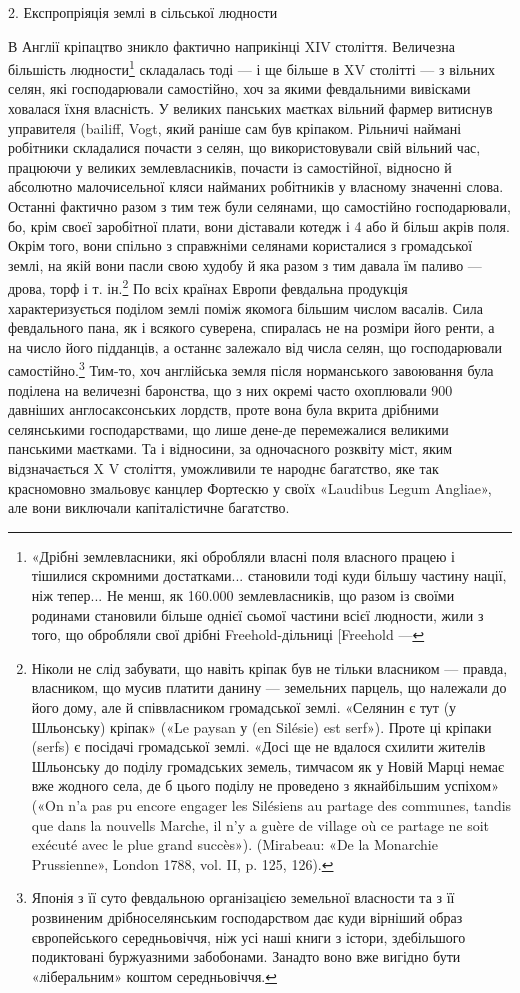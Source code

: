 2. Експропріяція землі в сільської людности

В Англії кріпацтво зникло фактично наприкінці XIV століття.
Величезна більшість людности\footnote{
«Дрібні землевласники, які обробляли власні поля власного працею
і тішилися скромними достатками... становили тоді куди більшу
частину нації, ніж тепер... Не менш, як 160.000 землевласників, що разом
із своїми родинами становили більше однієї сьомої частини всієї людности,
жили з того, що обробляли свої дрібні Freehold-дільниці [Freehold —
} складалась тоді — і ще
більше в XV столітті — з вільних селян, які господарювали
самостійно, хоч за якими февдальними вивісками ховалася їхня
власність. У великих панських маєтках вільний фармер витиснув
управителя (bailiff, Vogt, який раніше сам був кріпаком. Рільничі
наймані робітники складалися почасти з селян, що використовували
свій вільний час, працюючи у великих землевласників,
почасти із самостійної, відносно й абсолютно малочисельної
кляси найманих робітників у власному значенні слова. Останні
фактично разом з тим теж були селянами, що самостійно господарювали,
бо, крім своєї заробітної плати, вони діставали котедж
і 4 або й більш акрів поля. Окрім того, вони спільно з справжніми
селянами користалися з громадської землі, на якій вони пасли
свою худобу й яка разом з тим давала їм паливо — дрова, торф
і т. ін.\footnote{
Ніколи не слід забувати, що навіть кріпак був не тільки власником
— правда, власником, що мусив платити данину — земельних
парцель, що належали до його дому, але й співвласником громадської
землі. «Селянин є тут (у Шльонську) кріпак» («Le paysan у (en Silésie)
est serf»). Проте ці кріпаки (serfs) є посідачі громадської землі. «Досі
ще не вдалося схилити жителів Шльонську до поділу громадських
земель, тимчасом як у Новій Марці немає вже жодного села, де б цього
поділу не проведено з якнайбільшим успіхом» («On n’a pas pu encore
engager les Silésiens au partage des communes, tandis que dans la nouvells
Marche, il n’y a guère de village où ce partage ne soit exécuté avec le plue
grand succès»). (Mirabeau: «De la Monarchie Prussienne», London 1788,
vol. II, p. 125, 126).
} По всіх країнах Европи февдальна продукція характеризується
поділом землі поміж якомога більшим числом васалів.
Сила февдального пана, як і всякого суверена, спиралась не на
розміри його ренти, а на число його підданців, а останнє залежало
від числа селян, що господарювали самостійно.\footnote{
Японія з її суто февдальною організацією земельної власности
та з її розвиненим дрібноселянським господарством дає куди вірніший
образ європейського середньовіччя, ніж усі наші книги з істори, здебільшого
подиктовані буржуазними забобонами. Занадто воно вже вигідно
бути «ліберальним» коштом середньовіччя.
} Тим-то,
хоч англійська земля після норманського завоювання була
поділена на величезні баронства, що з них окремі часто охоплювали
900 давніших англосаксонських лордств, проте вона була
вкрита дрібними селянськими господарствами, що лише дене-де
перемежалися великими панськими маєтками. Та і відносини,
за одночасного розквіту міст, яким відзначається X V століття,
уможливили те народнє багатство, яке так красномовно
змальовує канцлер Фортескю у своїх «Laudibus Legum Angliae»,
але вони виключали капіталістичне багатство.

